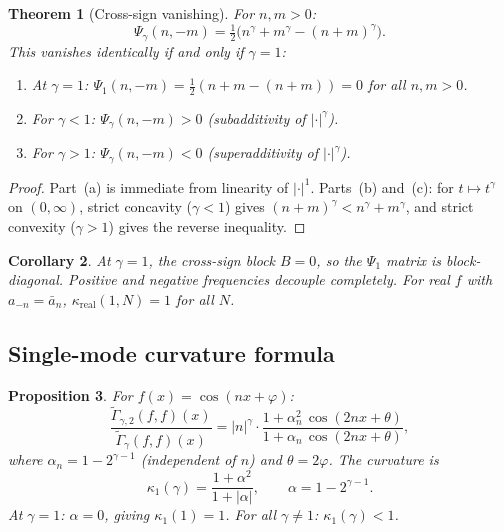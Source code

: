\documentclass[11pt,a4paper]{article}
\theoremstyle{plain}
\newtheorem{theorem}{Theorem}[section]
\newtheorem{proposition}[theorem]{Proposition}
\newtheorem{corollary}[theorem]{Corollary}
\theoremstyle{definition}
\theoremstyle{remark}
\begin{document}
\begin{theorem}[Cross-sign vanishing]\label{thm:cross-sign}
For $n,m > 0$:
\begin{equation}\label{eq:cross-sign}
  \Psi_\gamma(n,-m) = \tfrac{1}{2}\bigl(n^\gamma + m^\gamma
  - (n+m)^\gamma\bigr).
\end{equation}
This vanishes identically if and only if $\gamma = 1$:
\begin{enumerate}[label=(\alph*)]
\item At $\gamma = 1$: $\Psi_1(n,-m)
  = \tfrac{1}{2}(n + m - (n+m)) = 0$ for all $n,m > 0$.
\item For $\gamma < 1$: $\Psi_\gamma(n,-m) > 0$
  (subadditivity of $|\cdot|^\gamma$).
\item For $\gamma > 1$: $\Psi_\gamma(n,-m) < 0$
  (superadditivity of $|\cdot|^\gamma$).
\end{enumerate}
\end{theorem}

\begin{proof}
Part~(a) is immediate from linearity of $|\cdot|^1$.
Parts~(b) and~(c): for $t \mapsto t^\gamma$ on $(0,\infty)$,
strict concavity ($\gamma < 1$) gives
$(n+m)^\gamma < n^\gamma + m^\gamma$, and strict convexity
($\gamma > 1$) gives the reverse inequality.
\end{proof}

\begin{corollary}\label{cor:block-diag}
At $\gamma = 1$, the cross-sign block $B = 0$, so the $\Psi_1$
matrix is block-diagonal. Positive and negative frequencies
decouple completely. For real $f$ with $a_{-n} = \bar{a}_n$,
$\kappa_{\mathrm{real}}(1,N) = 1$ for all $N$.
\end{corollary}


\subsection{Single-mode curvature formula}

\begin{proposition}\label{prop:single-mode}
For $f(x) = \cos(nx + \varphi)$:
\begin{equation}\label{eq:single-mode}
  \frac{\widetilde{\Gamma}_{\gamma,2}(f,f)(x)}
       {\widetilde{\Gamma}_\gamma(f,f)(x)}
  = |n|^\gamma \cdot
  \frac{1 + \alpha_n^2\,\cos(2nx+\theta)}
       {1 + \alpha_n\,\cos(2nx+\theta)},
\end{equation}
where $\alpha_n = 1 - 2^{\gamma-1}$ (independent of $n$)
and $\theta = 2\varphi$. The curvature is
\begin{equation}\label{eq:kappa1}
  \kappa_1(\gamma) = \frac{1 + \alpha^2}{1 + |\alpha|},
  \qquad \alpha = 1 - 2^{\gamma-1}.
\end{equation}
At $\gamma = 1$: $\alpha = 0$, giving $\kappa_1(1) = 1$.
For all $\gamma \neq 1$: $\kappa_1(\gamma) < 1$.
\end{proposition}
\end{document}
